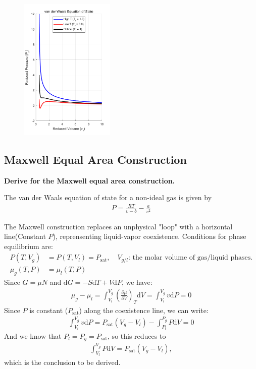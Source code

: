 \documentclass[../../main.tex]{subfiles}
\begin{document}
\begin{enumerate}
    	\begin{figure}[!htbp]  
		\centering
		\includegraphics[width=0.4\textwidth,height=0.54\textwidth]{fig/vdw.png}
	\end{figure}
  \end{enumerate}

\subsection{Maxwell Equal Area Construction}

\textbf{Derive for the Maxwell equal area construction.}
  
  The van der Waals equation of state for a non-ideal gas is given by
  \begin{align*}
    P = \frac{RT}{v-b} - \frac{a}{v^{2}}
  \end{align*}
  
  The Maxwell construction replaces an unphysical "loop" with a horizontal line(Constant $P$), reprensenting liquid-vapor coexistence. Conditions for phase equilibrium are:
  \begin{align*}
    P(T,V_{g}) &= P(T,V_{l}) = P_{\text{sat}},\quad V_{g/l}\text{: the molar volume of gas/liquid phases.}\\
    \mu_{g}(T,P) &= \mu_{l}(T,P) 
  \end{align*}
  Since $G = \mu N$ and $\mathrm{d}G = -S\mathrm{d}T + V\mathrm{d}P$, we have:
  \begin{align*}
    \mu_{g} - \mu_{l} = \int_{V_{l}}^{V_{g}}\left(\frac{\partial \mu}{\partial V}\right)_{T}\mathrm{d}V = \int_{V_{l}}^{V_{g}}v\mathrm{d}P = 0
  \end{align*}
  Since $P$ is constant ($P_{\text{sat}}$) along the coexistence line, we can write:
  \begin{align*}
    \int_{V_{l}}^{V_{g}}v\mathrm{d}P = P_{\text{sat}}(V_{g}-V_{l}) - \int_{P_{l}}^{P_{g}}P\mathrm{d}V = 0
  \end{align*}
  And we know that $P_{l} = P_{g} = P_{\text{sat}}$, so this reduces to
  \begin{align*}
    \boxed{\int_{V_{l}}^{V_{g}}P\mathrm{d}V = P_{\text{sat}}(V_{g}-V_{l})},
  \end{align*}
  which is the conclusion to be derived.
\end{document}
